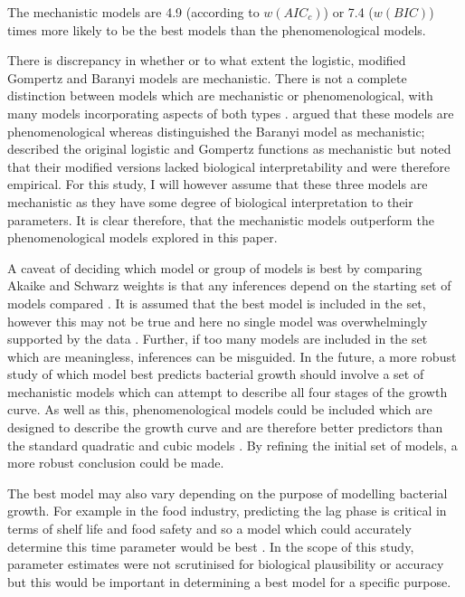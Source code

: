 \documentclass[11pt]{article}
\begin{document}
\begin{linenumbers}
        The mechanistic models are 4.9 (according to $w(AIC_c)$) or 7.4 ($w(BIC)$) times more likely to be the best models than the phenomenological models. 
        
        There is discrepancy in whether or to what extent the logistic, modified Gompertz and Baranyi models are mechanistic. There is not a complete distinction between models which are mechanistic or phenomenological, with many models incorporating aspects of both types \citep{ferrer_mathematical_2009}. \cite{peleg_modeling_1997} argued that these models are phenomenological whereas \cite{ferrer_mathematical_2009} distinguished the Baranyi model as mechanistic; \cite{mckellar_primary_2003} described the original logistic and Gompertz functions as mechanistic but noted that their modified versions lacked biological interpretability and were therefore empirical. For this study, I will however assume that these three models are mechanistic as they have some degree of biological interpretation to their parameters. It is clear therefore, that the mechanistic models outperform the phenomenological models explored in this paper. 
        
        A caveat of deciding which model or group of models is best by comparing Akaike and Schwarz weights is that any inferences depend on the starting set of models compared \citep{johnson_model_2004}. It is assumed that the best model is included in the set, however this may not be true and here no single model was overwhelmingly supported by the data \citep{buchanan_when_1997}. Further, if too many models are included in the set which are meaningless, inferences can be misguided. In the future, a more robust study of which model best predicts bacterial growth should involve a set of mechanistic models which can attempt to describe all four stages of the growth curve. As well as this, phenomenological models could be included which are designed to describe the growth curve and are therefore better predictors than the standard quadratic and cubic models \citep[e.g.][]{salazar_primary_2021}. By refining the initial set of models, a more robust conclusion could be made.
        
        The best model may also vary depending on the purpose of modelling bacterial growth. For example in the food industry, predicting the lag phase is critical in terms of shelf life and food safety and so a model which could accurately determine this time parameter would be best \citep{ross_modeling_2003, mahdinia_microbial_2020}. In the scope of this study, parameter estimates were not scrutinised for biological plausibility or accuracy but this would be important in determining a best model for a specific purpose. 
        

\end{linenumbers}
\end{document}
